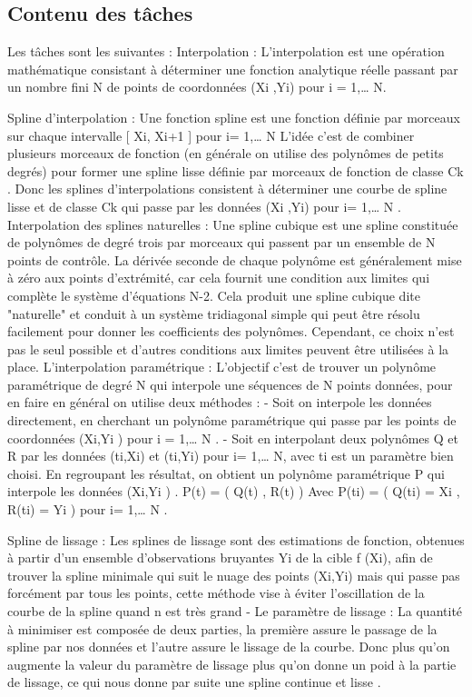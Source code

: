 \documentclass[a4paper,10pt]{article} %
\begin{document}
	\subsection{Contenu des tâches}
	Les tâches sont les suivantes : 
Interpolation :
            L’interpolation est une opération mathématique consistant à déterminer une fonction analytique réelle passant par un nombre fini N de points de coordonnées  (Xi ,Yi)  pour              i = 1,… N.
 
Spline d’interpolation :
            Une fonction spline est une fonction  définie par morceaux sur chaque intervalle          [ Xi, Xi+1 ]  pour  i= 1,… N
            L’idée c’est de combiner plusieurs morceaux de fonction (en générale on utilise des polynômes de petits degrés) pour former une spline lisse définie par morceaux de fonction de classe Ck . Donc les splines d’interpolations consistent à déterminer une courbe de spline lisse et de classe Ck qui passe par les données (Xi ,Yi)  pour  i= 1,… N .
Interpolation des splines naturelles :
            Une spline cubique est une spline constituée de polynômes de degré trois par morceaux qui passent par un ensemble de N points de contrôle. La dérivée seconde de chaque polynôme est généralement mise à zéro aux points d'extrémité, car cela fournit une condition aux limites qui complète le système d'équations N-2. Cela produit une spline cubique dite "naturelle" et conduit à un système tridiagonal simple qui peut être résolu facilement pour donner les coefficients des polynômes. Cependant, ce choix n'est pas le seul possible et d'autres conditions aux limites peuvent être utilisées à la place.
L’interpolation paramétrique :
             L'objectif  c’est de trouver un polynôme paramétrique de degré N qui interpole une séquences de N points données,  pour en faire en général on utilise deux méthodes :
-          Soit on interpole les données directement,  en cherchant un polynôme paramétrique qui passe par les points de coordonnées (Xi,Yi )   pour   i =  1,… N .
-          Soit en interpolant deux polynômes Q et R par les données (ti,Xi) et (ti,Yi) pour i= 1,… N, avec ti est un paramètre bien choisi. En regroupant les résultat, on obtient un polynôme paramétrique P qui interpole les données (Xi,Yi ) .
                P(t) = ( Q(t) , R(t) )
                         Avec      P(ti) = ( Q(ti) = Xi , R(ti) = Yi )     pour  i= 1,… N .
 
Spline de lissage :
            Les splines de lissage sont des estimations de fonction, obtenues à partir d'un ensemble d'observations bruyantes Yi de la cible f (Xi), afin de trouver la spline minimale qui suit le nuage des points (Xi,Yi) mais qui passe pas forcément par tous les points, cette méthode vise à éviter l’oscillation de la courbe de la spline quand n est très grand   
-          Le paramètre de lissage  :
            La quantité à minimiser est composée de deux parties, la première assure le passage de la spline par nos données  et l’autre assure le lissage  de la courbe. Donc plus qu’on augmente la valeur du paramètre de lissage plus qu’on donne un poid à la partie de lissage, ce qui nous donne par suite une spline continue et lisse .
 
\end{document}
